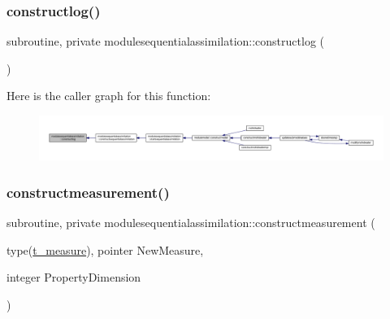 \subsubsection{\texorpdfstring{constructlog()}{constructlog()}}
{\footnotesize\ttfamily subroutine, private modulesequentialassimilation\+::constructlog (\begin{DoxyParamCaption}{ }\end{DoxyParamCaption})\hspace{0.3cm}{\ttfamily [private]}}

Here is the caller graph for this function\+:\nopagebreak
\begin{figure}[H]
\begin{center}
\leavevmode
\includegraphics[width=350pt]{namespacemodulesequentialassimilation_a199d6fc518c2a4bb9604a7fdbf0ca4e6_icgraph}
\end{center}
\end{figure}
\mbox{\label{namespacemodulesequentialassimilation_af3fc907b2e8cf5fb7cad188eb652528d}} 
\subsubsection{\texorpdfstring{constructmeasurement()}{constructmeasurement()}}
{\footnotesize\ttfamily subroutine, private modulesequentialassimilation\+::constructmeasurement (\begin{DoxyParamCaption}\item[{type(\mbox{\hyperlink{structmodulesequentialassimilation_1_1t__measure}{t\+\_\+measure}}), pointer}]{New\+Measure,  }\item[{integer}]{Property\+Dimension }\end{DoxyParamCaption})\hspace{0.3cm}{\ttfamily [private]}}

